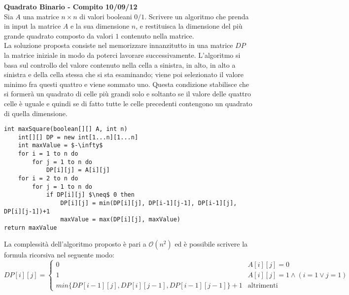 \documentclass[../cheatSheetAlgoritmi.tex]{subfiles}
\begin{document}
\bigskip
\textbf{Quadrato Binario - Compito 10/09/12}\\
Sia $A$ una matrice $n \times n$ di valori booleani $0/1$. Scrivere un algoritmo che prenda in input la matrice $A$ e la sua dimensione $n$, e restituisca la dimensione del più grande quadrato composto da valori $1$ contenuto nella matrice.\\
La soluzione proposta consiste nel memorizzare innanzitutto in una matrice $DP$ la matrice iniziale in modo da poterci lavorare successivamente. L'algoritmo si basa sul controllo del valore contenuto nella cella a sinistra, in alto, in alto a sinistra e della cella stessa che si sta esaminando; viene poi selezionato il valore minimo fra questi quattro e viene sommato uno. Questa condizione stabilisce che si formerà un quadrato di celle più grandi solo e soltanto se il valore delle quattro celle è uguale e quindi se di fatto tutte le celle precedenti contengono un quadrato di quella dimensione.
\begin{lstlisting}[caption=Quadrato Binario]
int maxSquare(boolean[][] A, int n)
	int[][] DP = new int[1...n][1...n]
	int maxValue = $-\infty$
	for i = 1 to n do
		for j = 1 to n do
			DP[i][j] = A[i][j]
	for i = 2 to n do
		for j = 1 to n do
			if DP[i][j] $\neq$ 0 then
				DP[i][j] = min(DP[i][j], DP[i-1][j-1], DP[i-1][j], DP[i][j-1])+1
				maxValue = max(DP[i][j], maxValue)
return maxValue
\end{lstlisting}
La complessità dell'algoritmo proposto è pari a $\mathcal{O}(n^{2})$ ed è possibile scrivere la formula ricorsiva nel seguente modo:
\begin{equation*}
    DP[i][j]=\begin{cases}
        0 & \text{$A[i][j] = 0$}\\
        1 & \text{$A[i][j] = 1 \land (i = 1 \lor j = 1)$} \\
        min\{DP[i-1][j], DP[i][j-1], DP[i-1][j-1]\}+1 & \text{altrimenti}
    \end{cases}
\end{equation*}
\newpage
\end{document}
